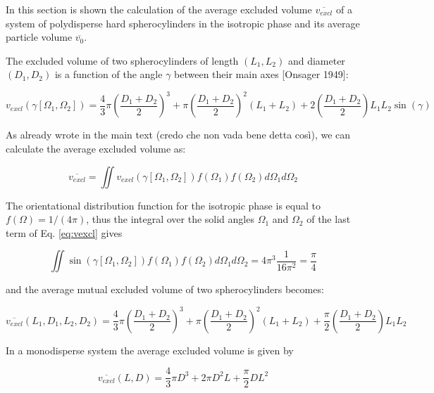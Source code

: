 \documentclass[journal=jacsat,manuscript=article]{achemso}
\begin{document}
In this section is shown the calculation of the average excluded volume $\overline{v_{excl}}$ of a system of polydisperse hard spherocylinders in the isotropic phase and its average particle volume $\overline{v_0}$.

The excluded volume of two spherocylinders of length $(L_1, L_2)$ and diameter $(D_1, D_2)$ is a function of the angle $\gamma$ between their main axes [Onsager 1949]:

\begin{equation} \label{eq:vexcl}
    v_{excl}(\gamma[\Omega_1, \Omega_2]) = \frac{4}{3} \pi \left(\frac{D_1 + D_2}{2}\right)^3 + \pi \left(\frac{D_1 + D_2}{2}\right)^2 (L_1 + L_2) + 2 \left( \frac{D_1 + D_2}{2} \right) L_1 L_2 \sin(\gamma)
\end{equation}

As already wrote in the main text (credo che non vada bene detta così), we can calculate the average excluded volume as:

\begin{equation}
	\overline{v_{excl}}  = \iint v_{excl}(\gamma[\Omega_1, \Omega_2]) f(\Omega_1)f(\Omega_2) d\Omega_1 d\Omega_2    
\end{equation}

The orientational distribution function for the isotropic phase is equal to $f(\Omega) = 1 / (4 \pi)$, thus the integral over the solid angles $\Omega_1$ and $\Omega_2$ of the last term of Eq. \ref{eq:vexcl} gives

\begin{equation}
    \iint \sin{\left(\gamma[\Omega_1, \Omega_2]\right) f(\Omega_1) f(\Omega_2) d\Omega_1 d\Omega_2 =4 \pi^3} \frac{1}{16 \pi^2} = \frac{\pi}{4}
\end{equation}

and the average mutual excluded volume of two spherocylinders becomes:

\begin{equation} \label{eq:mean_vexcl}
    \overline{v_{excl}}(L_1, D_1, L_2, D_2) = \frac{4}{3} \pi \left(\frac{D_1 + D_2}{2}\right)^3 + \pi \left(\frac{D_1 + D_2}{2}\right)^2 (L_1 + L_2) + \frac{\pi}{2} \left( \frac{D_1 + D_2}{2} \right) L_1 L_2
\end{equation} 

In a monodisperse system the average excluded volume is given by

\begin{equation} \label{eq:vexcl_mono}
   \overline{v_{excl}}(L, D) = \frac{4}{3} \pi D^3 + 2 \pi D^2 L + \frac{\pi}{2} D L^2
\end{equation}
\end{document}
